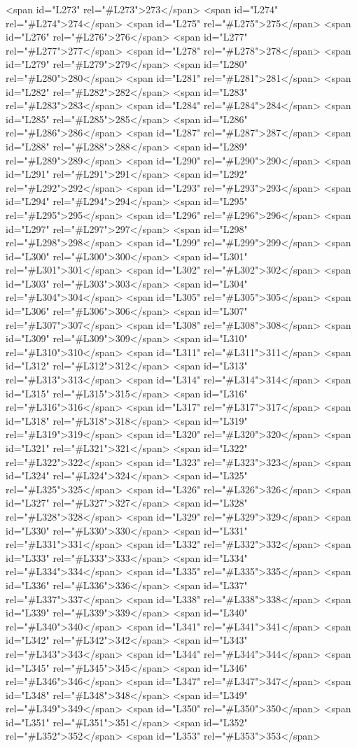 <span id="L273" rel="#L273">273</span>
<span id="L274" rel="#L274">274</span>
<span id="L275" rel="#L275">275</span>
<span id="L276" rel="#L276">276</span>
<span id="L277" rel="#L277">277</span>
<span id="L278" rel="#L278">278</span>
<span id="L279" rel="#L279">279</span>
<span id="L280" rel="#L280">280</span>
<span id="L281" rel="#L281">281</span>
<span id="L282" rel="#L282">282</span>
<span id="L283" rel="#L283">283</span>
<span id="L284" rel="#L284">284</span>
<span id="L285" rel="#L285">285</span>
<span id="L286" rel="#L286">286</span>
<span id="L287" rel="#L287">287</span>
<span id="L288" rel="#L288">288</span>
<span id="L289" rel="#L289">289</span>
<span id="L290" rel="#L290">290</span>
<span id="L291" rel="#L291">291</span>
<span id="L292" rel="#L292">292</span>
<span id="L293" rel="#L293">293</span>
<span id="L294" rel="#L294">294</span>
<span id="L295" rel="#L295">295</span>
<span id="L296" rel="#L296">296</span>
<span id="L297" rel="#L297">297</span>
<span id="L298" rel="#L298">298</span>
<span id="L299" rel="#L299">299</span>
<span id="L300" rel="#L300">300</span>
<span id="L301" rel="#L301">301</span>
<span id="L302" rel="#L302">302</span>
<span id="L303" rel="#L303">303</span>
<span id="L304" rel="#L304">304</span>
<span id="L305" rel="#L305">305</span>
<span id="L306" rel="#L306">306</span>
<span id="L307" rel="#L307">307</span>
<span id="L308" rel="#L308">308</span>
<span id="L309" rel="#L309">309</span>
<span id="L310" rel="#L310">310</span>
<span id="L311" rel="#L311">311</span>
<span id="L312" rel="#L312">312</span>
<span id="L313" rel="#L313">313</span>
<span id="L314" rel="#L314">314</span>
<span id="L315" rel="#L315">315</span>
<span id="L316" rel="#L316">316</span>
<span id="L317" rel="#L317">317</span>
<span id="L318" rel="#L318">318</span>
<span id="L319" rel="#L319">319</span>
<span id="L320" rel="#L320">320</span>
<span id="L321" rel="#L321">321</span>
<span id="L322" rel="#L322">322</span>
<span id="L323" rel="#L323">323</span>
<span id="L324" rel="#L324">324</span>
<span id="L325" rel="#L325">325</span>
<span id="L326" rel="#L326">326</span>
<span id="L327" rel="#L327">327</span>
<span id="L328" rel="#L328">328</span>
<span id="L329" rel="#L329">329</span>
<span id="L330" rel="#L330">330</span>
<span id="L331" rel="#L331">331</span>
<span id="L332" rel="#L332">332</span>
<span id="L333" rel="#L333">333</span>
<span id="L334" rel="#L334">334</span>
<span id="L335" rel="#L335">335</span>
<span id="L336" rel="#L336">336</span>
<span id="L337" rel="#L337">337</span>
<span id="L338" rel="#L338">338</span>
<span id="L339" rel="#L339">339</span>
<span id="L340" rel="#L340">340</span>
<span id="L341" rel="#L341">341</span>
<span id="L342" rel="#L342">342</span>
<span id="L343" rel="#L343">343</span>
<span id="L344" rel="#L344">344</span>
<span id="L345" rel="#L345">345</span>
<span id="L346" rel="#L346">346</span>
<span id="L347" rel="#L347">347</span>
<span id="L348" rel="#L348">348</span>
<span id="L349" rel="#L349">349</span>
<span id="L350" rel="#L350">350</span>
<span id="L351" rel="#L351">351</span>
<span id="L352" rel="#L352">352</span>
<span id="L353" rel="#L353">353</span>

